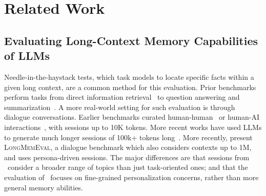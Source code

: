 \section{Related Work}


% 


\subsection{Evaluating Long-Context Memory Capabilities of LLMs}
Needle-in-the-haystack tests, which task models to locate specific facts within a given long context, are a common method for this evaluation. Prior benchmarks perform tasks from direct information retrieval~\citep{kuratov2024search, nelson2024needle} to question answering and summarization~\citep{xu2024stress, bai-etal-2024-longbench, zhang2024bench}. 
A more real-world setting for such evaluation is through dialogue conversations. Earlier benchmarks curated human-human~\citep{xu2021beyond} or human-AI interactions~\cite{xu-etal-2022-long}, with sessions up to 10K tokens. More recent works have used LLMs to generate much longer sessions of 100k+ tokens long~\citep{maharana2024evaluating,kim2024dialsim,castillo2024beyond}. 
More recently, \cite{wu2024longmemeval} present \textsc{LongMemEval}, a dialogue benchmark which also considers contexts up to 1M, and uses persona-driven sessions. The major differences are that sessions from \datasetname~consider a broader range of topics than just task-oriented ones; and that the evaluation of \datasetname~focuses on fine-grained personalization concerns, rather than more general memory abilities.

